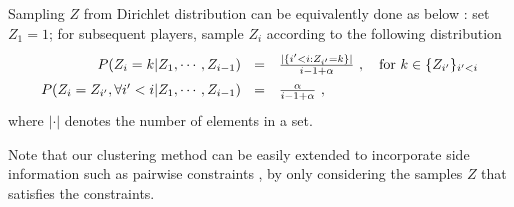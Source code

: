 Sampling $Z$ from Dirichlet distribution can be equivalently done as below \cite{neal2000markov}: 
set $Z_1 = 1$; for subsequent players, sample $Z_i$ according to  the following distribution 
\begin{equation*}
\label{eq:condition}
\renewcommand*{\arraystretch}{1.5}
\begin{array}{rl}
    P(Z_i = k | Z_1, \cdots, Z_{i-1}) 
~~=& \frac{|\{i' < i : Z_{i'} = k\}|}{i-1 + \alpha}  ~, \quad \text{for } k \in \{Z_{i'}\}_{i' < i}  \\
   P(Z_i = Z_{i'}, \forall i' < i | Z_1, \cdots, Z_{i-1}) 
~~=& \frac{\alpha}{i-1 + \alpha} ~,
\end{array}
\end{equation*}
where $|\cdot|$ denotes the number of elements in a set.

Note that our clustering method can be easily extended to incorporate side information 
such as pairwise constraints \cite{constraintBook}, by only considering the samples $Z$ that
satisfies the constraints.

